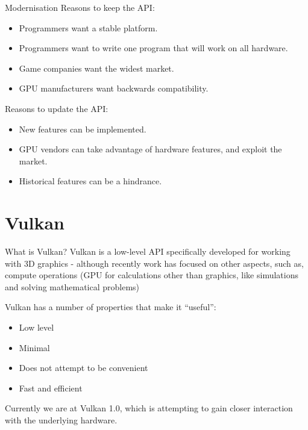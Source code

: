 \documentclass[handout,18pt]{beamer}
\begin{document}
\begin{frame}{Modernisation}
\pause
Reasons to keep the API:
\begin{itemize}
\pause \item Programmers want a stable platform.
\pause \item Programmers want to write one program that will work on all hardware.
\pause \item Game companies want the widest market.
\pause \item GPU manufacturers want backwards compatibility.
\end{itemize}
\pause

\vspace{11pt}
Reasons to update the API:
\begin{itemize}
\pause \item New features can be implemented.
\pause \item GPU vendors can take advantage of hardware features, and exploit the market.
\pause \item Historical features can be a hindrance.
\end{itemize}
\end{frame}

\section{Vulkan}

\begin{frame}{What is Vulkan?}
\pause
Vulkan is a low-level API specifically developed for working with 3D graphics - although recently work has focused on other aspects, such as, compute operations (GPU for calculations other than graphics, like simulations and solving mathematical problems)
\pause

\vspace{11pt}
Vulkan has a number of properties that make it ``useful'':
\begin{itemize}
\item Low level
\item Minimal
\item Does not attempt to be convenient
\item Fast and efficient
\end{itemize}
\pause

\vspace{11pt}
Currently we are at Vulkan 1.0, which is attempting to gain closer interaction with the underlying hardware.
\end{frame}
\end{document}
